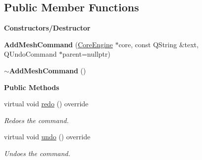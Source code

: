 \subsection*{Public Member Functions}
\begin{Indent}\textbf{ Constructors/\+Destructor}\par
\begin{DoxyCompactItemize}
\item 
\mbox{\label{classrev_1_1_add_mesh_command_a7848b46953a1f974bd99c45d784f78dd}} 
{\bfseries Add\+Mesh\+Command} (\mbox{\hyperlink{classrev_1_1_core_engine}{Core\+Engine}} $\ast$core, const Q\+String \&text, Q\+Undo\+Command $\ast$parent=nullptr)
\item 
\mbox{\label{classrev_1_1_add_mesh_command_ac71613fb5443b2c14ab8dbf8e134d271}} 
{\bfseries $\sim$\+Add\+Mesh\+Command} ()
\end{DoxyCompactItemize}
\end{Indent}
\begin{Indent}\textbf{ Public Methods}\par
\begin{DoxyCompactItemize}
\item 
\mbox{\label{classrev_1_1_add_mesh_command_a5778930a2dd8196f04c6a9f0b542ae47}} 
virtual void \mbox{\hyperlink{classrev_1_1_add_mesh_command_a5778930a2dd8196f04c6a9f0b542ae47}{redo}} () override
\begin{DoxyCompactList}\small\item\em Redoes the command. \end{DoxyCompactList}\item 
\mbox{\label{classrev_1_1_add_mesh_command_ab7a3917bfda1f03933e147da44fca4af}} 
virtual void \mbox{\hyperlink{classrev_1_1_add_mesh_command_ab7a3917bfda1f03933e147da44fca4af}{undo}} () override
\begin{DoxyCompactList}\small\item\em Undoes the command. \end{DoxyCompactList}\end{DoxyCompactItemize}
\end{Indent}
